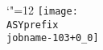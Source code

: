 \setlength{\unitlength}{1pt}%
\makeatletter%
\let\ASYencoding\f@encoding%
\let\ASYfamily\f@family%
\let\ASYseries\f@series%
\let\ASYshape\f@shape%
\makeatother%
{\catcode`"=12%
\texttt{[image: \\ASYprefix\\jobname-103+0\_0]}%
}%

